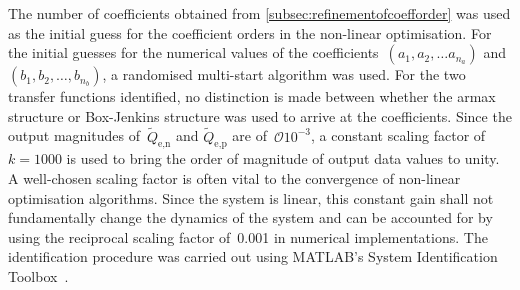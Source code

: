 The  number of  coefficients obtained  from \cref{subsec:refinementofcoefforder}
was  used as  the initial  guess for  the coefficient  orders in  the non-linear
optimisation.  For  the  initial  guesses   for  the  numerical  values  of  the
coefficients~$(a_1, a_2,  \dots a_{n_a})$ and ${(b_1, b_2, \dots  , b_{n_b} )}$, a
randomised  multi-start  algorithm was  used.  For  the two  transfer  functions
identified, no distinction is made  between whether the \gls{armax} structure or
Box-Jenkins structure was  used to arrive at the coefficients.  Since the output
magnitudes of~$\widetilde{Q}_{\text{e,n}}$  and $\widetilde{Q}_{\text{e,p}}$ are
of~$\mathcal{O}{10^{-3}}$,  a  constant  scaling   factor  of~${k  =  1000}$  is
used  to  bring the  order  of  magnitude of  output  data  values to  unity.  A
well-chosen  scaling factor  is often  vital  to the  convergence of  non-linear
optimisation algorithms.  Since the system  is linear, this constant  gain shall
not fundamentally change the dynamics of the  system and can be accounted for by
using the reciprocal  scaling factor of~0.001 in  numerical implementations. The
identification procedure  was carried  out using MATLAB's  System Identification
Toolbox~\cite{matlabsysidtool}.

